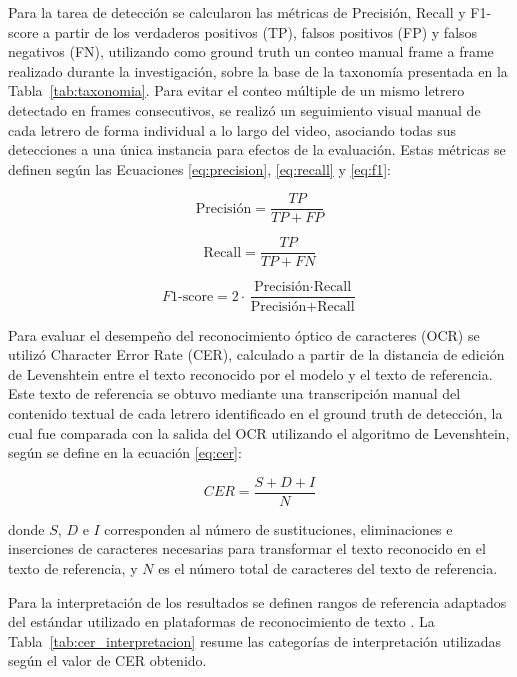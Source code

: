 \documentclass[conference]{IEEEtran}
\begin{document}
Para la tarea de detección se calcularon las métricas de Precisión, Recall y F1-score 
a partir de los verdaderos positivos (TP), falsos positivos (FP) y falsos negativos (FN), 
utilizando como ground truth \cite{ibm_ground_truth} un conteo manual frame a frame realizado durante la investigación, sobre la base de la taxonomía presentada en la 
Tabla~\ref{tab:taxonomia}. Para evitar el conteo múltiple de un mismo letrero detectado 
en frames consecutivos, se realizó un seguimiento visual manual de cada letrero de forma 
individual a lo largo del video, asociando todas sus detecciones a una única instancia 
para efectos de la evaluación. Estas métricas se definen según las Ecuaciones 
\ref{eq:precision}, \ref{eq:recall} y \ref{eq:f1}:

\begin{equation}
\text{Precisión} = \frac{TP}{TP + FP}
\label{eq:precision}
\end{equation}

\begin{equation}
\text{Recall} = \frac{TP}{TP + FN}
\label{eq:recall}
\end{equation}

\begin{equation}
F1\text{-score} = 2 \cdot \frac{\text{Precisión} \cdot \text{Recall}}{\text{Precisión} + \text{Recall}}
\label{eq:f1}
\end{equation}

Para evaluar el desempeño del reconocimiento óptico de caracteres (OCR) se utilizó 
Character Error Rate (CER), calculado a partir de la distancia de edición de 
Levenshtein \cite{levenshtein1966binary,transkribus-cer} entre el texto reconocido 
por el modelo y el texto de referencia. Este texto de referencia se obtuvo mediante 
una transcripción manual del contenido textual de cada letrero identificado en el 
ground truth de detección, la cual fue comparada con la salida del OCR utilizando 
el algoritmo de Levenshtein, según se define en la ecuación \ref{eq:cer}:

\begin{equation}
CER = \frac{S + D + I}{N}
\label{eq:cer}
\end{equation}

\noindent donde $S$, $D$ e $I$ corresponden al número de sustituciones, eliminaciones 
e inserciones de caracteres necesarias para transformar el texto reconocido en el texto 
de referencia, y $N$ es el número total de caracteres del texto de referencia.

Para la interpretación de los resultados se definen rangos de referencia adaptados del 
estándar utilizado en plataformas de reconocimiento de texto \cite{transkribus-cer}. 
La Tabla~\ref{tab:cer_interpretacion} resume las categorías de interpretación 
utilizadas según el valor de CER obtenido.
\end{document}
